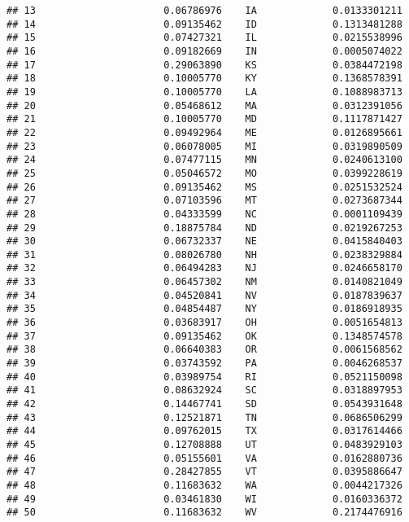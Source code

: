 \documentclass{article}\usepackage[]{graphicx}\usepackage[]{color}
\makeatletter
\newenvironment{kframe}{%
 \def\at@end@of@kframe{}%
 \ifinner\ifhmode%
  \def\at@end@of@kframe{\end{minipage}}%
  \begin{minipage}{\columnwidth}%
 \fi\fi%
 \def\FrameCommand##1{\hskip\@totalleftmargin \hskip-\fboxsep
 \colorbox{shadecolor}{##1}\hskip-\fboxsep
     \hskip-\linewidth \hskip-\@totalleftmargin \hskip\columnwidth}%
 \MakeFramed {\advance\hsize-\width
   \@totalleftmargin\z@ \linewidth\hsize
   \@setminipage}}%
 {\par\unskip\endMakeFramed%
 \at@end@of@kframe}
\newenvironment{knitrout}{}{} %
\makeatother
\begin{document}
\begin{knitrout}
\begin{kframe}
\begin{verbatim}
## 13                      0.06786976    IA             0.0133301211
## 14                      0.09135462    ID             0.1313481288
## 15                      0.07427321    IL             0.0215538996
## 16                      0.09182669    IN             0.0005074022
## 17                      0.29063890    KS             0.0384472198
## 18                      0.10005770    KY             0.1368578391
## 19                      0.10005770    LA             0.1088983713
## 20                      0.05468612    MA             0.0312391056
## 21                      0.10005770    MD             0.1117871427
## 22                      0.09492964    ME             0.0126895661
## 23                      0.06078005    MI             0.0319890509
## 24                      0.07477115    MN             0.0240613100
## 25                      0.05046572    MO             0.0399228619
## 26                      0.09135462    MS             0.0251532524
## 27                      0.07103596    MT             0.0273687344
## 28                      0.04333599    NC             0.0001109439
## 29                      0.18875784    ND             0.0219267253
## 30                      0.06732337    NE             0.0415840403
## 31                      0.08026780    NH             0.0238329884
## 32                      0.06494283    NJ             0.0246658170
## 33                      0.06457302    NM             0.0140821049
## 34                      0.04520841    NV             0.0187839637
## 35                      0.04854487    NY             0.0186918935
## 36                      0.03683917    OH             0.0051654813
## 37                      0.09135462    OK             0.1348574578
## 38                      0.06640383    OR             0.0061568562
## 39                      0.03743592    PA             0.0046268537
## 40                      0.03989754    RI             0.0521150098
## 41                      0.08632924    SC             0.0318897953
## 42                      0.14467741    SD             0.0543931648
## 43                      0.12521871    TN             0.0686506299
## 44                      0.09762015    TX             0.0317614466
## 45                      0.12708888    UT             0.0483929103
## 46                      0.05155601    VA             0.0162880736
## 47                      0.28427855    VT             0.0395886647
## 48                      0.11683632    WA             0.0044217326
## 49                      0.03461830    WI             0.0160336372
## 50                      0.11683632    WV             0.2174476916

\end{verbatim}
\end{kframe}
\end{knitrout}
\end{document}
